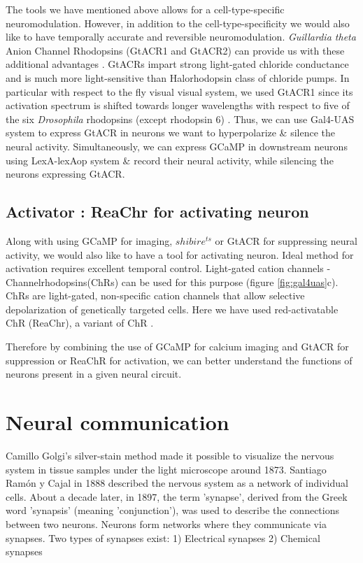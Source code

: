The tools we have mentioned above allows for a cell-type-specific neuromodulation. However, in addition to the cell-type-specificity we would also like to have temporally accurate and reversible neuromodulation. \textit{Guillardia theta} Anion Channel Rhodopsins (GtACR1 and GtACR2) can provide us with these additional advantages \parencite{Govorunova2015}. GtACRs impart strong light-gated chloride conductance and is much more light-sensitive than Halorhodopsin class of chloride pumps. In particular with respect to the fly visual visual system, we used GtACR1 since its activation spectrum is shifted towards longer wavelengths with respect to five of the six \textit{Drosophila} rhodopsins (except rhodopsin 6) \parencite{Mauss2017, Mohammad2017}. Thus, we can use Gal4-UAS system to express GtACR in neurons we want to hyperpolarize \& silence the neural activity. Simultaneously, we can express GCaMP in downstream neurons using LexA-lexAop system \& record their neural activity, while silencing the neurons expressing GtACR. 

 
\subsection{Activator : ReaChr for activating neuron}
Along with using GCaMP for imaging, $shibire^{ts}$ or GtACR for suppressing neural activity, we would also like to have a tool for activating neuron. Ideal method for activation requires excellent temporal control. Light-gated cation channels - Channelrhodopsins(ChRs) can be used for this purpose (figure  \ref{fig:gal4uas}c). ChRs are light-gated, non-specific cation channels that allow selective depolarization of genetically targeted cells. Here we have used red-activatable ChR (ReaChr), a variant of ChR \parencite{Lin2013, Busch2018}. 

Therefore by combining the use of GCaMP for calcium imaging and GtACR for suppression or ReaChR for activation, we can better understand the functions of neurons present in a given neural circuit.

\section{Neural communication}
Camillo Golgi's silver-stain method made it possible to visualize the nervous system in tissue samples under the light microscope around 1873. Santiago Ramón y Cajal in 1888 described the nervous system as a network of individual cells. About a decade later, in 1897, the term 'synapse', derived from the Greek word 'synapsis' (meaning 'conjunction'), was used to describe the connections between two neurons. Neurons form networks where they communicate via synapses. Two types of synapses exist: 1) Electrical synapses 2) Chemical synapses

